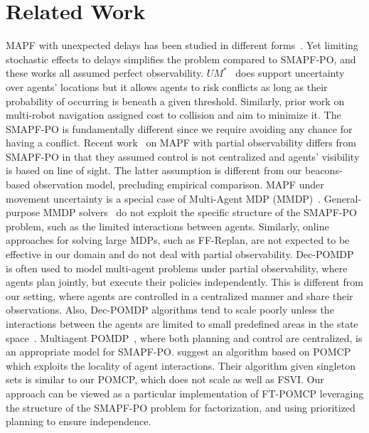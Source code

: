 \documentclass[letterpaper]{article} %
\begin{document}
\section{Related Work}
MAPF with unexpected delays has been studied in different forms~\cite{atzmon2020probabilistic,shahar2021safe,atzmon2020robust,ma2017multiAgent}. Yet limiting stochastic effects to delays simplifies the problem compared to SMAPF-PO, and these works all assumed perfect observability.
$UM^*$~\cite{wagner2017path} does support uncertainty over agents' locations but it allows agents to risk conflicts as long as their probability of occurring is beneath a given threshold. Similarly, prior work on multi-robot navigation assigned cost to collision and aim to minimize it.
The SMAPF-PO is fundamentally different since we require avoiding any chance for having a conflict. %
Recent work~\cite{davydov2021q} on MAPF with partial observability differs from SMAPF-PO in that they assumed control is not centralized and agents' visibility is based on line of sight. The latter assumption is different from our beacons-based observation model, precluding empirical comparison.
MAPF under movement uncertainty is a special case of Multi-Agent MDP (MMDP)~\cite{boutilier1996planning}.
General-purpose MMDP solvers~\cite{de2021constrained} do not exploit the specific structure of the SMAPF-PO problem, such as the limited interactions between agents. Similarly, online approaches for solving large MDPs, such as FF-Replan\cite{yoon2007ff}, are not expected to be effective in our domain and do not deal with partial observability.
Dec-POMDP~\cite{oliehoek2012decentralized} is often used to model multi-agent problems under partial observability, where agents plan jointly, but execute their policies independently.
This is different from our setting, where agents are controlled in a centralized manner and share their observations.
Also, Dec-POMDP algorithms tend to scale poorly unless the interactions between the agents are limited to small predefined areas in the state space~\cite{melo2009learning}.
Multiagent POMDP~\cite{oliehoek2017madp}, where both planning and control are centralized, is an appropriate model for SMAPF-PO.  \citet{amato2015scalable} suggest an algorithm based on POMCP which exploits the locality of agent interactions.
Their algorithm given singleton sets is similar to our POMCP, which does not scale as well as FSVI.
Our approach can be viewed as a particular implementation of FT-POMCP leveraging the structure of the SMAPF-PO problem for factorization, and using prioritized planning to ensure independence.
\end{document}
